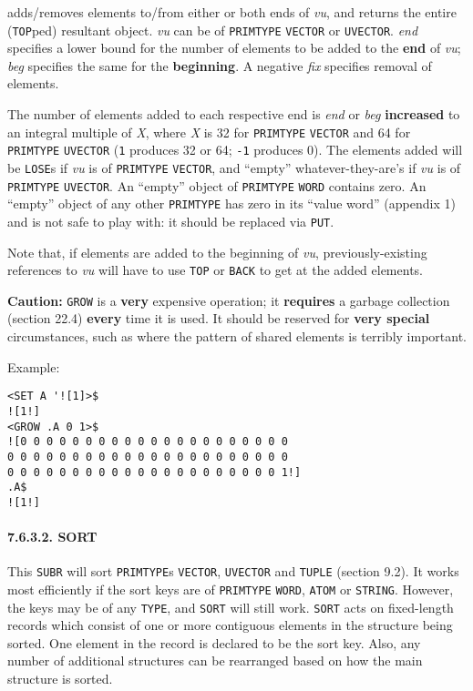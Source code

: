 \documentclass[a4paper,]{article}
\let\oldparagraph\paragraph
\renewcommand{\paragraph}[1]{\oldparagraph{#1}\mbox{}}
\begin{document}
 adds/removes elements to/from either or both ends of \emph{vu}, and returns the entire
(\texttt{TOP}ped) resultant object. \emph{vu} can be of \texttt{PRIMTYPE} \texttt{VECTOR} or \texttt{UVECTOR}. \emph{end}
specifies a lower bound for the number of elements to be added to the \textbf{end} of \emph{vu}; \emph{beg} specifies the
same for the \textbf{beginning}. A negative \emph{fix} specifies removal of elements.

The number of elements added to each respective end is \emph{end} or \emph{beg} \textbf{increased} to an integral multiple
of \emph{X}, where \emph{X} is 32 for \texttt{PRIMTYPE} \texttt{VECTOR} and 64 for \texttt{PRIMTYPE} \texttt{UVECTOR}
(\texttt{1} produces 32 or 64; \texttt{-1} produces 0). The elements added will be \texttt{LOSE}s if
\emph{vu} is of \texttt{PRIMTYPE} \texttt{VECTOR}, and ``empty'' whatever-they-are's if \emph{vu} is of \texttt{PRIMTYPE}
\texttt{UVECTOR}. An ``empty'' object of \texttt{PRIMTYPE} \texttt{WORD} contains zero. An ``empty'' object of any other
\texttt{PRIMTYPE} has zero in its ``value word'' (appendix 1) and is not safe to play with: it should be replaced via
\texttt{PUT}.

Note that, if elements are added to the beginning of \emph{vu}, previously-existing references to \emph{vu} will have to
use \texttt{TOP} or \texttt{BACK} to get at the added elements.

\textbf{Caution:} \texttt{GROW} is a \textbf{very} expensive operation; it \textbf{requires} a garbage collection (section
22.4) \textbf{every} time it is used. It should be reserved for \textbf{very special} circumstances, such as where the
pattern of shared elements is terribly important.

Example:

\begin{verbatim}
<SET A '![1]>$
![1!]
<GROW .A 0 1>$
![0 0 0 0 0 0 0 0 0 0 0 0 0 0 0 0 0 0 0 0 0
0 0 0 0 0 0 0 0 0 0 0 0 0 0 0 0 0 0 0 0 0 0
0 0 0 0 0 0 0 0 0 0 0 0 0 0 0 0 0 0 0 0 0 1!]
.A$
![1!]
\end{verbatim}

\paragraph{7.6.3.2. SORT}\label{sort}

 This \texttt{SUBR} will sort \texttt{PRIMTYPE}s \texttt{VECTOR}, \texttt{UVECTOR} and
\texttt{TUPLE} (section 9.2). It works most efficiently if the sort keys are of \texttt{PRIMTYPE} \texttt{WORD},
\texttt{ATOM} or \texttt{STRING}. However, the keys may be of any \texttt{TYPE}, and \texttt{SORT} will still work.
\texttt{SORT} acts on fixed-length records which consist of one or more contiguous elements in the structure being sorted.
One element in the record is declared to be the sort key. Also, any number of additional structures can be rearranged based
on how the main structure is sorted.
\end{document}
